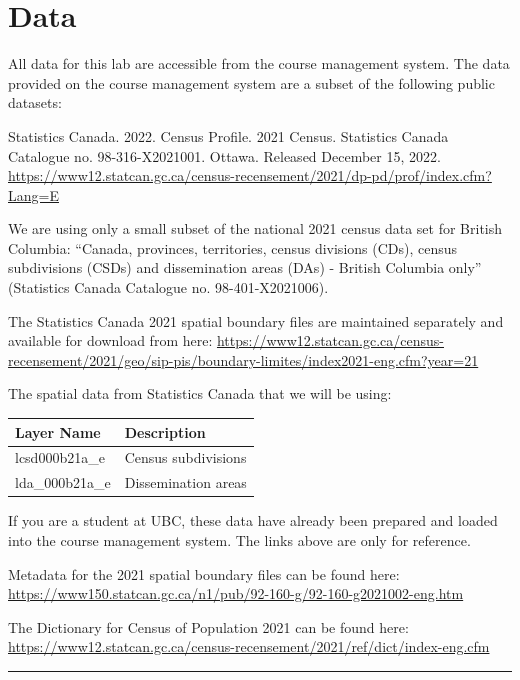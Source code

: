 \documentclass[
]{book}
\begin{document}
\hypertarget{lab6-data}{%
\section*{Data}\label{lab6-data}}

All data for this lab are accessible from the course management system. The data provided on the course management system are a subset of the following public datasets:

Statistics Canada. 2022. Census Profile. 2021 Census. Statistics Canada Catalogue no. 98-316-X2021001. Ottawa. Released December 15, 2022. \url{https://www12.statcan.gc.ca/census-recensement/2021/dp-pd/prof/index.cfm?Lang=E}

We are using only a small subset of the national 2021 census data set for British Columbia: ``Canada, provinces, territories, census divisions (CDs), census subdivisions (CSDs) and dissemination areas (DAs) - British Columbia only'' (Statistics Canada Catalogue no. 98-401-X2021006).

The Statistics Canada 2021 spatial boundary files are maintained separately and available for download from here: \url{https://www12.statcan.gc.ca/census-recensement/2021/geo/sip-pis/boundary-limites/index2021-eng.cfm?year=21}

The spatial data from Statistics Canada that we will be using:

\begin{longtable}[]{@{}ll@{}}
\toprule\noalign{}
Layer Name & Description \\
\midrule\noalign{}
\endhead
\bottomrule\noalign{}
\endlastfoot
lcsd000b21a\_e & Census subdivisions \\
lda\_000b21a\_e & Dissemination areas \\
\end{longtable}

If you are a student at UBC, these data have already been prepared and loaded into the course management system. The links above are only for reference.

Metadata for the 2021 spatial boundary files can be found here: \url{https://www150.statcan.gc.ca/n1/pub/92-160-g/92-160-g2021002-eng.htm}

The Dictionary for Census of Population 2021 can be found here: \url{https://www12.statcan.gc.ca/census-recensement/2021/ref/dict/index-eng.cfm}

\begin{center}\rule{0.5\linewidth}{0.5pt}\end{center}
\end{document}
